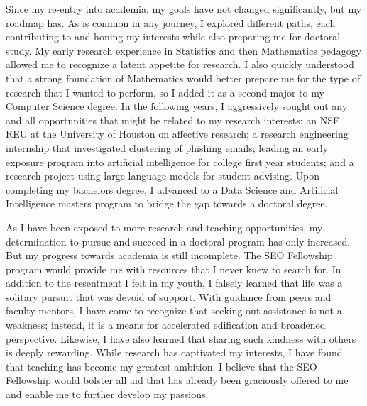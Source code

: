 \documentclass[12pt]{article}
\begin{document}
Since my re-entry into academia, my goals have not changed significantly, but my
roadmap has. As is common in any journey, I explored different paths, each
contributing to and honing my interests while also preparing me for doctoral
study.  My early research experience in Statistics and then Mathematics pedagogy
allowed me to recognize a latent appetite for research.  I also quickly understood
that a strong foundation of Mathematics would better prepare me for the type of
research that I wanted to perform, so I added it as a second major to my Computer
Science degree.  In the following years, I aggressively sought out any
and all opportunities that might be related to my research
interests: an NSF REU at the University of Houston on affective
research; a research engineering internship that investigated
clustering of phishing emails; leading an early exposure program into artificial
intelligence for college first year students; and a research project
using large language models for student advising.  Upon completing my bachelors
degree, I advanced to a Data Science and Artificial Intelligence
masters program to bridge the gap towards a doctoral degree.  

As I have been exposed to more research and teaching opportunities, my
determination to pursue and succeed in a doctoral program has only increased.
But my progress towards
academia is still incomplete. The SEO Fellowship program would provide me with
resources that I never knew to search for.  In addition to the resentment I felt
in my youth, I falsely learned that life was a solitary pursuit that was devoid
of support.  With guidance from peers and faculty mentors, I have come to
recognize that seeking out assistance is not a weakness; instead, it is a means
for accelerated edification and broadened perspective.  Likewise, I have also
learned that sharing such kindness with others is deeply rewarding. While research has
captivated my interests, I have found that teaching has become my greatest
ambition.  I believe that the SEO Fellowship would bolster all aid that
has already been graciously offered to me and enable me to further
develop my passions.
\end{document}
